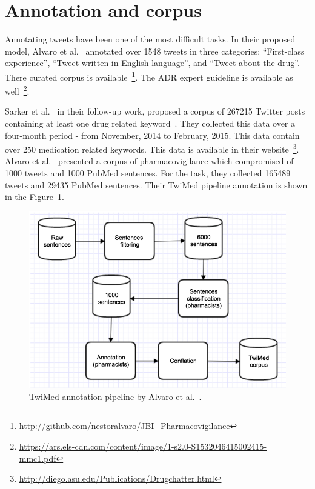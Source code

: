\section{Annotation and corpus}

Annotating tweets have been one of the most difficult tasks. In their proposed model, Alvaro et al.~\cite{alvaro2015crowdsourcing} annotated over 1548 tweets in three categories: “First-class experience”, “Tweet written in English language”, and “Tweet about the drug”. There curated corpus is available~\footnote{\url{http://github.com/nestoralvaro/JBI_Pharmacovigilance}}. The ADR expert guideline is available as well~\footnote{\url{https://ars.els-cdn.com/content/image/1-s2.0-S1532046415002415-mmc1.pdf}}.

Sarker et al.~\cite{sarker2016social} in their follow-up work, proposed a corpus  of  267215  Twitter  posts  containing  at least one drug related keyword~\cite{sarker2017corpus}. They collected this data  over a four-month  period - from  November, 2014  to  February, 2015. This data contain over 250 medication related keywords. This data is available in their website~\footnote{\url{http://diego.asu.edu/Publications/Drugchatter.html}}. Alvaro et al.~\cite{alvaro2017twimed} presented a corpus of pharmacovigilance which compromised of 1000 tweets and 1000 PubMed sentences. For the task, they collected 165489 tweets and 29435 PubMed sentences. Their TwiMed pipeline annotation is shown in the Figure~\ref{fig:architecture-twimed-alvaro}.

\begin{figure}[h]
	\centering
	\includegraphics[width=0.99\linewidth]{Figures/b.png}
	\caption{TwiMed annotation pipeline by Alvaro et al.~\cite{alvaro2017twimed}.}
	\label{fig:architecture-twimed-alvaro}
\end{figure}

